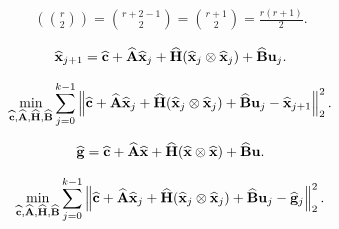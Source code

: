 \documentclass[12 pt]{article}
\begin{document}
\begin{align*}
    \left(\!\!{r\choose 2}\!\!\right)
    = \binom{r + 2 - 1}{2}
    = \binom{r+1}{2}
    = \frac{r(r+1)}{2}.
\end{align*}

\begin{align*}
    \xrom_{j+1}
    = \crom
    + \Arom\xrom_{j}
    + \Hrom(\xrom_{j}\otimes\xrom_{j})
    + \Brom\ufom_{j}.
\end{align*}

\begin{align*}
    \min_{\crom,\Arom,\Hrom,\Brom}\sum_{j=0}^{k-1}\left\|
      \crom
    + \Arom\xrom_{j}
    + \Hrom(\xrom_{j}\otimes\xrom_{j})
    + \Brom\ufom_j
    - \xrom_{j+1}
    \right\|_2^2.
\end{align*}

\begin{align*}
    \grom
    = \crom
    + \Arom\xrom
    + \Hrom(\xrom \otimes \xrom)
    + \Brom\ufom.
\end{align*}

\begin{align*}
    \min_{\crom,\Arom,\Hrom,\Brom}\sum_{j=0}^{k-1}\left\|
      \crom
    + \Arom\xrom_{j}
    + \Hrom(\xrom_{j}\otimes\xrom_{j})
    + \Brom\ufom_j
    - \grom_{j}
    \right\|_2^2.
\end{align*}
\end{document}

